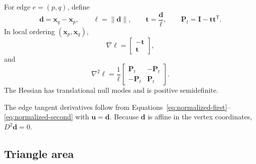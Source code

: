 \documentclass[11pt]{article}
\newcommand{\T}{\mathsf{T}}
\newcommand{\grad}{\nabla}
\newcommand{\Hess}{\nabla^2}
\newcommand{\Id}{\mathbf{I}}
\newcommand{\Pmat}{\mathbf{P}}
\begin{document}
For edge $e=(p,q)$, define
\begin{equation}
  \mathbf{d}=\mathbf{x}_q-\mathbf{x}_p,
  \qquad
  \ell=\|\mathbf{d}\|,
  \qquad
  \mathbf{t}=\frac{\mathbf{d}}{\ell},
  \qquad
  \Pmat_t=\Id-\mathbf{t}\mathbf{t}^\T.
\end{equation}
In local ordering $(\mathbf{x}_p,\mathbf{x}_q)$,
\begin{equation}
  \boxed{
  \grad\ell=
  \begin{bmatrix}
    -\mathbf{t}\\
     \mathbf{t}
  \end{bmatrix},}
\end{equation}
and
\begin{equation}
  \boxed{
  \Hess\ell
  =\frac{1}{\ell}
  \begin{bmatrix}
    \Pmat_t&-\Pmat_t\\
    -\Pmat_t&\Pmat_t
  \end{bmatrix}.}
  \label{eq:edge-length-hessian}
\end{equation}
The Hessian has translational null modes and is positive semidefinite.

The edge tangent derivatives follow from Equations~\eqref{eq:normalized-first}--\eqref{eq:normalized-second} with $\mathbf{u}=\mathbf{d}$.  Because $\mathbf{d}$ is affine in the vertex coordinates, $D^2\mathbf{d}=0$.

\subsection{Triangle area}
\end{document}

